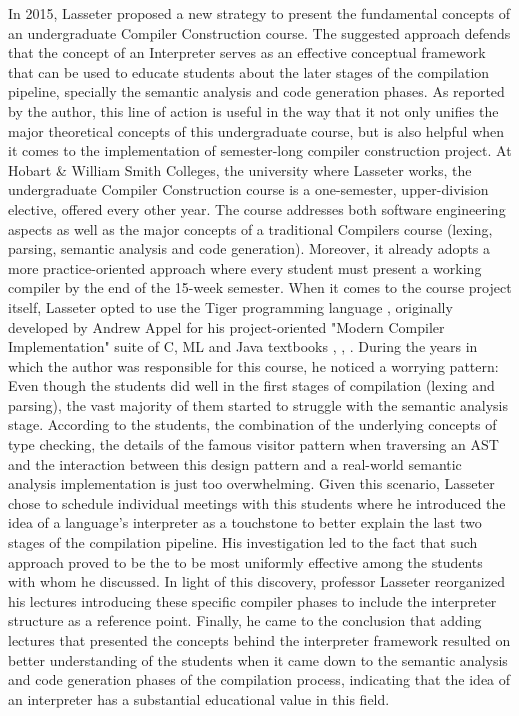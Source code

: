 In 2015, Lasseter \cite{lasseter2015interpreter} proposed a new strategy to present the fundamental concepts of an undergraduate Compiler Construction course. The suggested approach defends that the concept of an Interpreter serves as an effective conceptual framework that can be used to educate students about the later stages of the compilation pipeline, specially the semantic analysis and code generation phases. As reported by the author, this line of action is useful in the way that it not only unifies the major theoretical concepts of this undergraduate course, but is also helpful when it comes to the implementation of semester-long compiler construction project. At Hobart \& William Smith Colleges, the university where Lasseter works, the undergraduate Compiler Construction course is a one-semester, upper-division elective, offered every other year. The course addresses both software engineering aspects as well as the major concepts of a traditional Compilers course (lexing, parsing, semantic analysis and code generation). Moreover, it already adopts a more practice-oriented approach where every student must present a working compiler by the end of the 15-week semester. When it comes to the course project itself, Lasseter opted to use the Tiger programming language \cite{appel1998tiger}, originally developed by Andrew Appel for his project-oriented "Modern Compiler Implementation" suite of C, ML and Java textbooks \cite{appel1997modernCompilerImplementationC}, \cite{appel2002modernCompilerImplementationJava}, \cite{appel2004modernCompilerImplementationML}. During the years in which the author was responsible for this course, he noticed a worrying pattern: Even though the students did well in the first stages of compilation (lexing and parsing), the vast majority of them started to struggle with the semantic analysis stage. According to the students, the combination of the underlying concepts of type checking, the details of the famous visitor pattern when traversing an AST and the interaction between this design pattern and a real-world semantic analysis implementation is just too overwhelming. Given this scenario, Lasseter chose to schedule individual meetings with this students where he introduced the idea of a language's interpreter as a touchstone to better explain the last two stages of the compilation pipeline. His investigation led to the fact that such approach proved to be the to be most uniformly effective among the students with whom he discussed. In light of this discovery, professor Lasseter reorganized his lectures introducing these specific compiler phases to include the interpreter structure as a reference point. Finally, he came to the conclusion that adding lectures that presented the concepts behind the interpreter framework resulted on better understanding of the students when it came down to the semantic analysis and code generation phases of the compilation process, indicating that the idea of an interpreter has a substantial educational value in this field.

